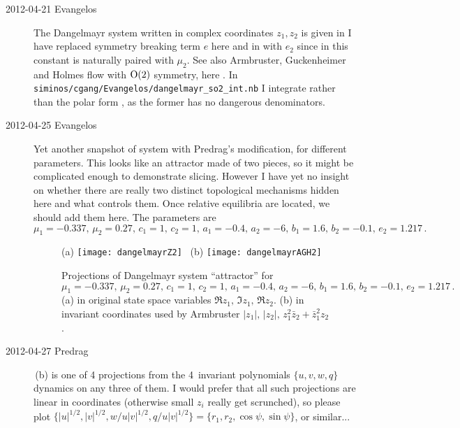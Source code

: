 \begin{description}
\item[2012-04-21 Evangelos]
The Dangelmayr system written in complex coordinates $z_1,z_2$
is given in  I have replaced symmetry breaking term $e$
here and in  with $e_2$ since in this constant is
naturally paired with $\mu_2$. See also Armbruster, Guckenheimer and
Holmes flow with $\textrm{O}(2)$ symmetry, here . In
\texttt{siminos/cgang/Evangelos/dangelmayr\_so2\_int.nb} I integrate
 rather than the polar form , as the
former has no dangerous denominators.

\item[2012-04-25 Evangelos] Yet another snapshot of {\twoMode}
system with Predrag's modification, for different parameters. This looks
like an attractor made of two pieces, so it might be complicated enough
to demonstrate slicing. However I have yet no insight on whether there
are really two distinct topological mechanisms hidden here and what
controls them. Once relative equilibria are located, we should add them
here. The parameters are
\[
 \mu_1 = -0.337,\, \mu_2 = 0.27,\, c_1 = 1,\, c_2 = 1,\,
 a_1 = -0.4,\, a_2 = -6,\, b_1 = 1.6,\,  b_2 = -0.1,\, e_2 = 1.217
 \,.
\]

 \begin{figure}[h]
\centering
 (a) \texttt{[image: dangelmayrZ2]}~
 (b) \texttt{[image: dangelmayrAGH2]}~
\caption{Projections of Dangelmayr system 
``attractor'' for $\mu_1 = -0.337,\, \mu_2 = 0.27,\, c_1 = 1,\, c_2 = 1,\,
a_1 = -0.4,\, a_2 = -6,\, b_1 = 1.6,\,  b_2 = -0.1,\, e_2 = 1.217\,.$
(a) in original state space variables $\Re z_1,\,\Im z_1,\,\Re z_2$.
(b) in invariant coordinates used by
Armbruster \etal{}
$|z_1|,\, |z_2|,\, z_1^2 \bar{z}_2 + \bar{z}_1^2 z_2$.
}
 \label{fig:dangelmayrChaos2}
\end{figure}

\item[2012-04-27 Predrag] \,(b) is one of 4
projections from the 4\dmn\ invariant polynomials $\{u,v,w,q\}$ dynamics
on any three of them. I would prefer that all such projections are linear
in coordinates (otherwise small $z_i$ really get scrunched), so please
plot $\{|u|^{1/2},|v|^{1/2},w/u |v|^{1/2} ,q/u |v|^{1/2} \}
= \{r_1,r_2, \cos\psi, \sin\psi \}$, or similar...



\end{description}

